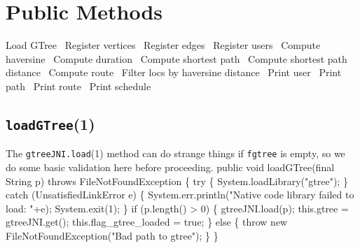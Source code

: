 \section{Public Methods}
\nwenddocs{}\endmoddef{}
  \LA{}Load GTree~{\nwtagstyle{}}\RA{}
  \LA{}Register vertices~{\nwtagstyle{}}\RA{}
  \LA{}Register edges~{\nwtagstyle{}}\RA{}
  \LA{}Register users~{\nwtagstyle{}}\RA{}
  \LA{}Compute haversine~{\nwtagstyle{}}\RA{}
  \LA{}Compute duration~{\nwtagstyle{}}\RA{}
  \LA{}Compute shortest path~{\nwtagstyle{}}\RA{}
  \LA{}Compute shortest path distance~{\nwtagstyle{}}\RA{}
  \LA{}Compute route~{\nwtagstyle{}}\RA{}
  \LA{}Filter locs by haversine distance~{\nwtagstyle{}}\RA{}
  \LA{}Print user~{\nwtagstyle{}}\RA{}
  \LA{}Print path~{\nwtagstyle{}}\RA{}
  \LA{}Print route~{\nwtagstyle{}}\RA{}
  \LA{}Print schedule~{\nwtagstyle{}}\RA{}
\nwendcode{}\nwdocspar

\subsection{{\tt{}\protect{}\protect{}loadGTree}(1)}
The {\tt{}gtreeJNI.load}(1) method can do strange things if {\tt{}f{}gtree} is empty,
so we do some basic validation here before proceeding.
\nwenddocs{}\endmoddef{}
public void loadGTree(final String p) throws FileNotFoundException \{
  try \{
    System.loadLibrary("gtree");
  \} catch (UnsatisfiedLinkError e) \{
    System.err.println("Native code library failed to load: "+e);
    System.exit(1);
  \}
  if (p.length() > 0) \{
    gtreeJNI.load(p);
    this.gtree = gtreeJNI.get();
    this.flag_gtree_loaded = true;
  \} else \{
    throw new FileNotFoundException("Bad path to gtree");
  \}
\}
\eatline
{}\nwendcode{}\nwdocspar
